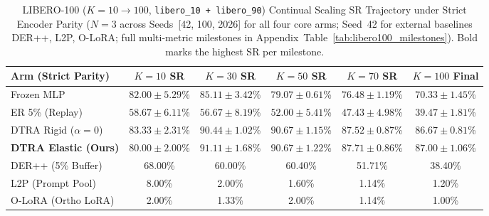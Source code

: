 \documentclass[10pt]{article}
\begin{document}
\begin{table}[ht!]
  \centering
  \caption{LIBERO-100 ($K=10 \to 100$, \texttt{libero\_10 + libero\_90}) Continual Scaling SR Trajectory under Strict Encoder Parity ($N=3$ across Seeds~[42, 100, 2026] for all four core arms; Seed~42 for external baselines DER++, L2P, O-LoRA; full multi-metric milestones in Appendix~Table~\ref{tab:libero100_milestones}). Bold marks the highest SR per milestone.}
  \label{tab:libero100_traj}
  \small
  \setlength{\tabcolsep}{3.5pt}
  \begin{tabular}{lccccc}
    \toprule
    \textbf{Arm (Strict Parity)} & \textbf{$K=10$ SR} & \textbf{$K=30$ SR} & \textbf{$K=50$ SR} & \textbf{$K=70$ SR} & \textbf{$K=100$ Final} \\
    \midrule
    Frozen MLP & $82.00 \pm 5.29$\% & $85.11 \pm 3.42$\% & $79.07 \pm 0.61$\% & $76.48 \pm 1.19$\% & $70.33 \pm 1.45$\% \\
    ER 5\% (Replay) & $58.67 \pm 6.11$\% & $56.67 \pm 8.19$\% & $52.00 \pm 5.41$\% & $47.43 \pm 4.98$\% & $39.47 \pm 1.81$\% \\
    DTRA Rigid ($\alpha=0$) & $\mathbf{83.33 \pm 2.31}$\% & $90.44 \pm 1.02$\% & $\mathbf{90.67 \pm 1.15}$\% & $87.52 \pm 0.87$\% & $86.67 \pm 0.81$\% \\
    \textbf{DTRA Elastic (Ours)} & $80.00 \pm 2.00$\% & $\mathbf{91.11 \pm 1.68}$\% & $\mathbf{90.67 \pm 1.22}$\% & $\mathbf{87.71 \pm 0.86}$\% & $\mathbf{87.00 \pm 1.06}$\% \\
    \midrule
    DER++ (5\% Buffer) & 68.00\% & 60.00\% & 60.40\% & 51.71\% & 38.40\% \\
    L2P (Prompt Pool) & 8.00\% & 2.00\% & 1.60\% & 1.14\% & 1.20\% \\
    O-LoRA (Ortho LoRA) & 2.00\% & 1.33\% & 2.00\% & 1.14\% & 1.00\% \\
    \bottomrule
  \end{tabular}
\end{table}
\end{document}
